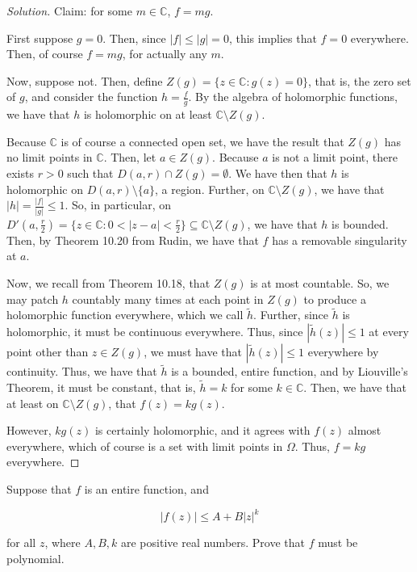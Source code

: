 \documentclass[10pt]{article}
\newenvironment{problem}[2][]{\begin{trivlist}
\item[\hskip \labelsep {\bfseries #1}\hskip \labelsep {\bfseries #2.}]}{\end{trivlist}}
\begin{document}
\begin{proof}[Solution]

Claim: for some $m \in \mathbb{C}$, $f = mg$.

First suppose $g = 0$. Then, since $|f| \leq |g| = 0$, this implies that $f = 0$ everywhere. Then, of course $f = mg$, for actually any $m$.

Now, suppose not. Then, define $Z(g) = \{ z \in \mathbb{C} : g(z) = 0 \}$, that is, the zero set of $g$, and consider the function $h = \frac{f}{g}$. By the algebra of holomorphic functions, we have that $h$ is holomorphic on at least $\mathbb{C} \setminus Z(g)$.

Because $\mathbb{C}$ is of course a connected open set, we have the result that $Z(g)$ has no limit points in $\mathbb{C}$. Then, let $a \in Z(g)$. Because $a$ is not a limit point, there exists $r > 0$ such that $D(a,r) \cap Z(g) = \emptyset$. We have then that $h$ is holomorphic on $D(a,r) \setminus \{ a \}$, a region. Further, on $\mathbb{C} \setminus Z(g)$, we have that $|h| = \frac{|f|}{|g|} \leq 1$. So, in particular, on $D'(a,\frac{r}{2}) = \{ z \in \mathbb{C} : 0 < |z - a| < \frac{r}{2} \} \subseteq \mathbb{C} \setminus Z(g)$, we have that $h$ is bounded. Then, by Theorem 10.20 from Rudin, we have that $f$ has a removable singularity at $a$.

Now, we recall from Theorem 10.18, that $Z(g)$ is at most countable. So, we may patch $h$ countably many times at each point in $Z(g)$ to produce a holomorphic function everywhere, which we call $\tilde{h}$. Further, since $\tilde{h}$ is holomorphic, it must be continuous everywhere. Thus, since $|\tilde{h}(z)| \leq 1$ at every point other than $z \in Z(g)$, we must have that $|\tilde{h}(z)| \leq 1$ everywhere by continuity. Thus, we have that $\tilde{h}$ is a bounded, entire function, and by Liouville's Theorem, it must be constant, that is, $\tilde{h} = k$ for some $k \in \mathbb{C}$. Then, we have that at least on $\mathbb{C} \setminus Z(g)$, that $f(z) = k g(z)$.

However, $k g(z)$ is certainly holomorphic, and it agrees with $f(z)$ almost everywhere, which of course is a set with limit points in $\Omega$. Thus, $f = kg$ everywhere.


\end{proof}

\begin{problem}{Question 4}
Suppose that $f$ is an entire function, and

$$ | f(z) | \leq A + B|z|^k$$

for all $z$, where $A, B, k$ are positive real numbers. Prove that $f$ must be polynomial.

\end{problem}
\end{document}
